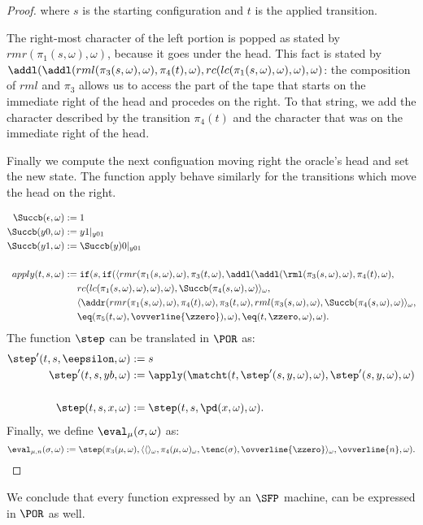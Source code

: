 \begin{proof}
where $s$ is the starting configuration and $t$ is the applied transition.

The right-most character of the left portion is popped
as stated by $rmr(\pi_1(s,\omega),\omega)$, because it goes under the head.
This fact is stated by $\addl(
\addl(rml(\pi_3(s,\omega), \omega), \pi_4(t),
\omega), rc(lc(\pi_1(s,\omega),\omega),
\omega),\omega)$: the composition of $rml$ and $\pi_3$ allows us to access the
part of the tape that starts on the immediate right of the head and procedes on the right.
To that string, we add the character described by the transition $\pi_4(t)$ and the character that was on the immediate right of the head.

Finally we compute the next configuation moving right the oracle's head and set the new state. The function apply behave similarly for the transitions which move the head on the right.


\begin{align*}
\Succb(\epsilon, \omega) &:= 1\\
\Succb(y0, \omega) &:= y1|_{y01}\\
\Succb(y1, \omega) &:= \Succb(y)0|_{y01}\\\\
%
apply(t,s,\omega) &:=
\mathtt{if}(s,\mathtt{if}(\langle rmr(
\pi_1(s,\omega),\omega),
\pi_3(t,\omega), \addl(
\addl(\rml(\pi_3(s,\omega), \omega), \pi_4(t),
\omega), \\
& \ \ \ \ rc(lc(\pi_1(s,\omega),\omega),
\omega),\omega),
{\Succb}(\pi_4(s,\omega),\omega)
\rangle_\omega, \\
&
 \ \ \ \ \langle\addr(rmr(\pi_1(s,\omega),\omega),
\pi_4(t),\omega), \pi_3(t,\omega),
rml(\pi_3(s,\omega),\omega),
{\Succb}(\pi_4(s,\omega),\omega)
\rangle_\omega, \\
& \ \ \ \ \eq(\pi_5(t,\omega),
{\ovverline{\zzero}}),\omega),
\eq(t,\zzero,\omega),\omega).
\end{align*}
%
%
The function $\step$
can be translated in $\POR$
as:
\begin{align*}
\step'(t,s,\eepsilon,\omega) &:= s \\
\step'(t,s,yb,\omega) &:= \apply(\matcht(t,\step'
(s,y,\omega), \omega),
\step'(s,y,\omega),\omega) \\
\\
\step(t,s,x,\omega) &:= \step(t,s,\pd(x,\omega),
\omega).
\end{align*}
%
%
Finally, we define $\eval_\mu(\sigma,\omega)$
as:
$$
\eval_{\mu,n}(\sigma,\omega) :=
\step(\pi_3(\mu,\omega), \langle \langle \rangle_\omega,
\pi_4(\mu,\omega)_\omega, \tenc(\sigma),
{\ovverline{\zzero}}\rangle_\omega,
\ovverline{n},\omega).
$$
\end{proof}
%
%
%
\noindent
We conclude that every function
expressed by an $\SFP$
machine, can be expressed in $\POR$
as well.


